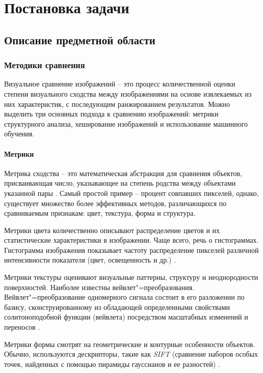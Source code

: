 \documentclass[variant=courcework]{bsuir}
\begin{document}
\chapter{Постановка задачи}

\section{Описание предметной области}

\subsection{Методики сравнения}
Визуальное сравнение изображений -- это процесс количественной оценки степени
визуального сходства между изображениями на основе извлекаемых из них
характеристик, с последующим ранжированием результатов. Можно выделить три
основных подхода к сравнению изображений: метрики структурного анализа,
хеширование изображений и использование машинного обучения.

\subsubsection{Метрики}
Метрика сходства -- это математическая абстракция для сравнения объектов,
присваивающая число, указывающее на степень родства между объектами указанной
пары \cite{ali2016survey}. Самый простой пример -- процент совпавших пикселей,
однако, существует множество более эффективных методов, различающихся по
сравниваемым признакам: цвет, текстура, форма и структура.

Метрики цвета количественно описывают распределение цветов и их статистические
характеристики в изображении. Чаще всего, речь о гистограммах. Гистограмма
изображения показывает частоту распределение пикселей различной интенсивности
показателя (цвет, освещенность и др.) \cite{ali2016survey}.

Метрики текстуры оценивают визуальные паттерны, структуру и неоднородности
поверхностей. Наиболее известны вейвлет"=преобразования. Вейвлет"=преобразование
одномерного сигнала состоит в его разложении по базису, сконструированному из
обладающей определенными свойствами солитоноподобной функции (вейвлета)
посредством масштабных изменений и переносов \cite{астафьева1996вейвлет}.

Метрики формы смотрят на геометрические и контурные особенности объектов.
Обычно, используются дескрипторы, такие как \textit{SIFT} (сравнение наборов
особых точек, найденных с помощью пирамиды гауссианов и ее разностей)
\cite{lowe2004distinctive}.
\end{document}
